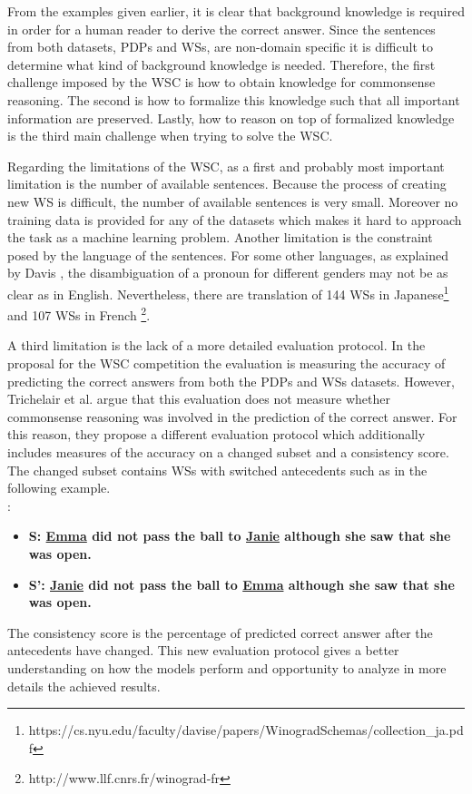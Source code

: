 From the examples given earlier, it is clear that background knowledge is required in order for a human reader to derive the correct answer. Since the sentences from both datasets, PDPs and WSs, are non-domain specific it is difficult to determine what kind of background knowledge is needed. Therefore, the first challenge imposed by the WSC is how to obtain knowledge for commonsense reasoning. 
The second is how to formalize this knowledge such that all important information are preserved. Lastly, how to reason on top of formalized knowledge is the third main challenge when trying to solve the WSC. 

Regarding the limitations of the WSC, as a first and probably most important limitation is the number of available sentences. Because the process of creating new WS is difficult, the number of available sentences is very small. Moreover no training data is provided for any of the datasets which makes it hard to approach the task as a machine learning problem. Another limitation is the constraint posed by the language of the sentences. For some other languages, as explained by Davis \cite{DBLP:journals/corr/Davis16}, the disambiguation of a pronoun for different genders may not be as clear as in English. Nevertheless, there are translation of 144 WSs in Japanese\footnote{https://cs.nyu.edu/faculty/davise/papers/WinogradSchemas/collection\_ja.pdf} and 107 WSs in French \footnote{http://www.llf.cnrs.fr/winograd-fr}. 

A third limitation is the lack of a more detailed evaluation protocol. In the proposal for the WSC competition the evaluation is measuring the accuracy of predicting the correct answers from both the PDPs and WSs datasets. However, Trichelair et al. \cite{DBLP:journals/corr/abs-1811-01778} argue that this evaluation does not measure whether commonsense reasoning was involved in the prediction of the correct answer. For this reason, they propose a different evaluation protocol which additionally includes measures of the accuracy on a changed subset and a consistency score. The changed subset contains WSs with switched antecedents such as in the following example. \\
:
\begin{itemize} 
	\item \textbf{S: \underline{Emma} did not pass the ball to \underline{Janie} although she saw that she was open.}
		\item \textbf{S': \underline{Janie} did not pass the ball to \underline{Emma} although she saw that she was open.} 
\end{itemize}

The consistency score is the percentage of predicted correct answer after the antecedents have changed. This new evaluation protocol gives a better understanding on how the models perform and opportunity to analyze in more details the achieved results.

 


